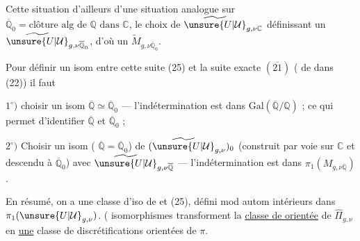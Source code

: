 
Cette situation  d'ailleurs  d'une situation analogue sur $\overline{\mathbb Q}_0=\text{clôture alg de }\mathbb Q\text{ dans }\mathbb C$, le choix de $\widetilde{\unsure{U|\mathcal{U}}}_{g,\nu\mathbb C}$ définissant un $\widetilde{\unsure{U|\mathcal{U}}}_{g,\nu\overline{\mathbb Q}_0}$, d'où un $\widetilde{M}_{g,\nu\overline{\mathbb Q}_0}$.

Pour définir un isom entre cette suite (25) et la suite exacte $(\overline{21})$  ( de  dans (22)) il faut

$1^{\circ})$ choisir un isom $\overline{\mathbb Q}\simeq\overline{\mathbb Q}_0$ --- l'indétermination est dans $\mathrm{Gal}(\overline{\mathbb Q}/\mathbb Q)$ ; ce qui permet d'identifier $\overline{\mathbb Q}$ et $\overline{\mathbb Q}_0$ ;

$2^{\circ})$ Choisir un isom ( $\overline{\mathbb Q}=\overline{\mathbb Q}_0$) de $(\widetilde{\unsure{U|\mathcal{U}}}_{g,\nu})_0$ (construit par voie  sur $\mathbb C$ et descendu à $\overline{\mathbb Q}_0$) avec $\widetilde{\unsure{U|\mathcal{U}}}_{g,\nu\overline{\mathbb Q}}$ --- l'indétermination est dans $\pi_1(M_{g,\nu\overline{\mathbb Q}})$.

En résumé, on a une classe d'iso de  et (25), défini mod autom  intérieurs dans  $\pi_1(\unsure{U|\mathcal{U}}_{g,\nu})$. ( isomorphismes  transforment la  \uline{classe de } \uline{orientée}  de $\widehat{\Pi}_{g,\nu}$ en   \uline{une} classe de discrétifications orientées de $\pi$.

